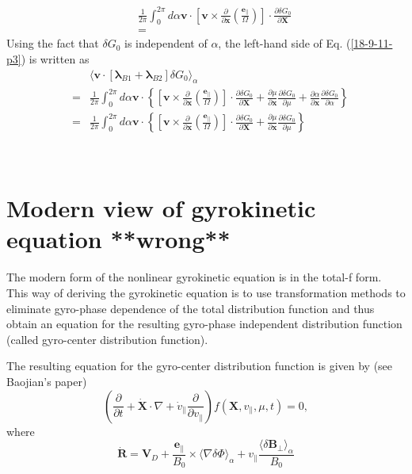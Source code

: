 \documentclass{article}
\newcommand{\tmmathbf}[1]{\ensuremath{\boldsymbol{#1}}}
\begin{document}
\begin{eqnarray*}
  &  & \frac{1}{2 \pi} \int_0^{2 \pi} d \alpha \mathbf{v} \cdot \left[
  \mathbf{v} \times \frac{\partial}{\partial \mathbf{x}} \left(
  \frac{\tmmathbf{e}_{\parallel}}{\Omega} \right) \right] \cdot \frac{\partial
  \delta G_0}{\partial \mathbf{X}}\\
  &  & =
\end{eqnarray*}
Using the fact that $\delta G_0$ is independent of $\alpha$, the left-hand
side of Eq. (\ref{18-9-11-p3}) is written as
\begin{eqnarray*}
  &  & \langle \mathbf{v} \cdot [\tmmathbf{\lambda}_{B 1}
  +\tmmathbf{\lambda}_{B 2}] \delta G_0 \rangle_{\alpha}\\
  & = & \frac{1}{2 \pi} \int_0^{2 \pi} d \alpha \mathbf{v} \cdot \left\{
  \left[ \mathbf{v} \times \frac{\partial}{\partial \mathbf{x}} \left(
  \frac{\tmmathbf{e}_{\parallel}}{\Omega} \right) \right] \cdot \frac{\partial
  \delta G_0}{\partial \mathbf{X}} + \frac{\partial \mu}{\partial \mathbf{x}} 
  \frac{\partial \delta G_0}{\partial \mu} + \frac{\partial \alpha}{\partial
  \mathbf{x}}  \frac{\partial \delta G_0}{\partial \alpha} \right\}\\
  & = & \frac{1}{2 \pi} \int_0^{2 \pi} d \alpha \mathbf{v} \cdot \left\{
  \left[ \mathbf{v} \times \frac{\partial}{\partial \mathbf{x}} \left(
  \frac{\tmmathbf{e}_{\parallel}}{\Omega} \right) \right] \cdot \frac{\partial
  \delta G_0}{\partial \mathbf{X}} + \frac{\partial \mu}{\partial \mathbf{x}} 
  \frac{\partial \delta G_0}{\partial \mu} \right\}
\end{eqnarray*}


\

\section{Modern view of gyrokinetic equation **wrong**}

The modern form of the nonlinear gyrokinetic equation is in the total-f form.
This way of deriving the gyrokinetic equation is to use transformation methods
to eliminate gyro-phase dependence of the total distribution function and thus
obtain an equation for the resulting gyro-phase independent distribution
function (called gyro-center distribution function).

The resulting equation for the gyro-center distribution function is given by
(see Baojian's paper)
\begin{equation}
  \left( \frac{\partial}{\partial t} + \dot{\mathbf{X}} \cdot \nabla +
  \dot{v}_{\parallel} \frac{\partial}{\partial v_{\parallel}} \right) f
  (\mathbf{X}, v_{\parallel}, \mu, t) = 0,
\end{equation}
where
\begin{equation}
  \dot{\mathbf{R}} =\mathbf{V}_D + \frac{\mathbf{e}_{\parallel}}{B_0} \times
  \langle \nabla \delta \Phi \rangle_{\alpha} + v_{\parallel} \frac{\langle
  \delta \mathbf{B}_{\perp} \rangle_{\alpha}}{B_0}
\end{equation}
\end{document}

